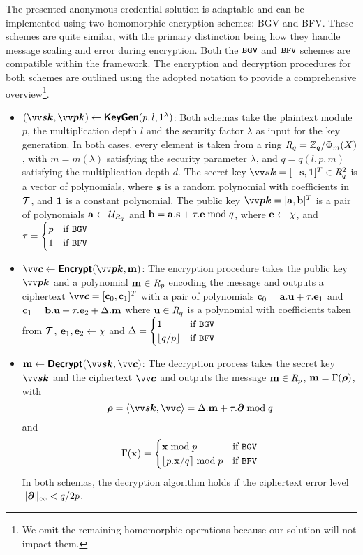 The presented anonymous credential solution is adaptable and can be implemented using two homomorphic encryption schemes: BGV and BFV. These schemes are quite similar, with the primary distinction being how they handle message scaling and error during encryption. Both the $\mathtt{BGV}$ and $\mathtt{BFV}$ schemes are compatible within the framework. The encryption and decryption procedures for both schemes are outlined using the adopted notation to provide a comprehensive overview\footnote{We omit the remaining homomorphic operations because our solution will not impact them.}.

\begin{itemize}[label={--}]
    \item $(\pv{sk},\pv{pk}) \from \bkw{KeyGen}(p, l, 1^\lambda)$: Both schemas take the plaintext module $p$, the multiplication depth $l$ and the security factor $\lambda$ as input for the key generation. In both cases, every element is taken from a ring $\mathit{R}_q = \mathbb{Z}_q/{\Phi_{m}}(X)$,  with $m=m(\lambda)$ satisfying the security parameter $\lambda$, and $q=q(l,p,m)$ satisfying the multiplication depth $d$. The secret key $\pv{sk} = [-\ps,\p{1}]^T \in \intring_q^2$ is a vector of polynomials, where $\mathbf{s}$ is a random polynomial with coefficients in $\mathcal{T}$, and $\bm{1}$ is a constant polynomial. The public key $\pv{pk}=[\pa,\pb]^T$ is a pair of polynomials $\mathbf{a} \leftarrow \mathcal{U}_{\mathit{R}_q}$ and $\mathbf{b}=\mathbf{a}.\mathbf{s}+\tau.\mathbf{e} \bmod q$, where $\mathbf{e} \leftarrow \chi$, and 
    $\tau = \begin{cases}
        p & \textrm{if } \mathtt{BGV}\\
        1 & \textrm{if } \mathtt{BFV}
    \end{cases}$
    \item $\pv{c} \from \bkw{Encrypt}(\pv{pk},\ppm)$: The encryption procedure takes the public key $\pv{pk}$ and a polynomial $\mathbf{m} \in \mathit{R}_p$ encoding the message and outputs a ciphertext $\pv{c} = [\pc_0,\pc_1]^T$ with a pair of polynomials $\mathbf{c}_0 = \mathbf{a}.\mathbf{u}+\tau.\mathbf{e}_1$ and $\mathbf{c}_1=\mathbf{b}.\mathbf{u}+\tau.\mathbf{e}_2+\Delta.\mathbf{m}$ where $\mathbf{u} \in \mathit{R}_q$ is a polynomial with coefficients taken from $\mathcal{T}$, $\mathbf{e}_1, \mathbf{e}_2 \leftarrow \chi$ and 
        $\Delta = \begin{cases}
        1 & \textrm{if } \mathtt{BGV}\\
        \left\lfloor q/p \right\rfloor & \textrm{if } \mathtt{BFV}
    \end{cases}$
    \item $\ppm \from \bkw{Decrypt}(\pv{sk},\pv{c})$: The decryption process takes the secret key $\pv{sk}$ and the ciphertext $\pv{c}$ and outputs the message $\mathbf{m} \in \mathit{R}_p$, $\mathbf{m}=\Gamma(\bm{\rho})$, with \[\p{\rho}=\inprod{\pv{sk}}{\pv{c}}=\Delta.\ppm+\tau.\p{\partial} \bmod q\] and \[\Gamma(\mathbf{x}) = \begin{cases} \mathbf{x} \bmod p & \textrm{if } \mathtt{BGV}\\ \left\lfloor p.\mathbf{x}/q \right\rceil \bmod p & \textrm{if } \mathtt{BFV}\end{cases}\]
    In both schemas, the decryption algorithm holds if the ciphertext error level $\|\bm{\partial}\|_{\infty} < q/2p$.
\end{itemize}
